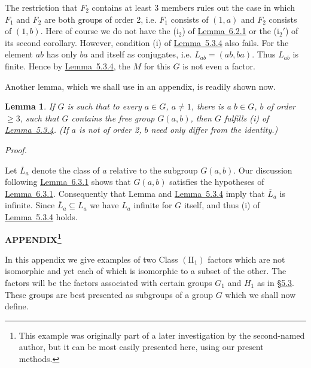 \documentclass[b5paper,twoside]{article}
\newcommand{\secref}[2]{\hyperref[#1]{\mbox{\S#2}}}
\newcommand{\lemref}[2]{\hyperref[#1]{\mbox{Lemma~#2}}}
\theoremstyle{mvnplain}
\newtheorem{lemma}{Lemma}[section]
\renewenvironment{proof}[1][Proof]{%
  \par\addvspace{0.35\baselineskip}%
  \noindent\textit{#1.}\ \normalfont\ignorespaces
}{%
  \par\addvspace{0.35\baselineskip}%
}
\newcommand{\M}{\mathbf M}
\def\M{M}%
\def\mathfrak#1{#1}%
\begin{document}
The restriction that $\mathfrak F_2$ contains at least 3 members rules out the
case in which $\mathfrak F_1$ and $\mathfrak F_2$ are both groups of order 2,
i.e. $\mathfrak F_1$ consists of $(1,a)$ and $\mathfrak F_2$ consists of
$(1,b)$. Here of course we do not have the (i$_2$) of
\lemref{lem:6.2.1}{6.2.1} or the (i$_2'$) of its second corollary. However,
condition (i) of \lemref{lem:5.3.4}{5.3.4} also fails. For the element $ab$
has only $ba$ and itself as conjugates, i.e. $\mathfrak L_{ab}=(ab,ba)$. Thus
$\mathfrak L_{ab}$ is finite. Hence by \lemref{lem:5.3.4}{5.3.4}, the $\M$
for this $\mathfrak G$ is not even a factor.

Another lemma, which we shall use in an appendix, is readily shown now.
\begin{lemma}\label{lem:6.3.2}
If $\mathfrak G$ is such that to every $a\in\mathfrak G$, $a\ne1$, there is a
$b\in\mathfrak G$, $b$ of order $\geq3$, such that $\mathfrak G$ contains the
free group $\mathfrak G(a,b)$, then $\mathfrak G$ fulfills (i) of
\lemref{lem:5.3.4}{5.3.4}. (If $a$ is not of order 2, $b$ need only differ
from the identity.)
\end{lemma}

\begin{proof}
Let $\overline{\mathfrak L}_a$ denote the class of $a$ relative to the subgroup
$\mathfrak G(a,b)$. Our discussion following \lemref{lem:6.3.1}{6.3.1}
shows that $\mathfrak G(a,b)$ satisfies the hypotheses of
\lemref{lem:6.3.1}{6.3.1}. Consequently that Lemma and
\lemref{lem:5.3.4}{5.3.4} imply that $\overline{\mathfrak L}_a$ is infinite.
Since $\overline{\mathfrak L}_a\subseteq\mathfrak L_a$ we have
$\mathfrak L_a$ infinite for $\mathfrak G$ itself, and thus (i) of
\lemref{lem:5.3.4}{5.3.4} holds.
\end{proof}

\label{appendix}
\begin{center}\bfseries\MakeUppercase{Appendix}\footnote{This example was
originally part of a later investigation by the second-named author, but it
can be most easily presented here, using our present methods.}\end{center}

In this appendix we give examples of two Class $(\mathrm{II}_1)$ factors which
are not isomorphic and yet each of which is isomorphic to a subset of the
other. The factors will be the factors associated with certain groups
$\mathfrak G_1$ and $\mathfrak H_1$ as in
\secref{sec:5.3}{5.3}. These groups are best presented as subgroups of a group
$\mathfrak G$ which we shall now define.
\end{document}
